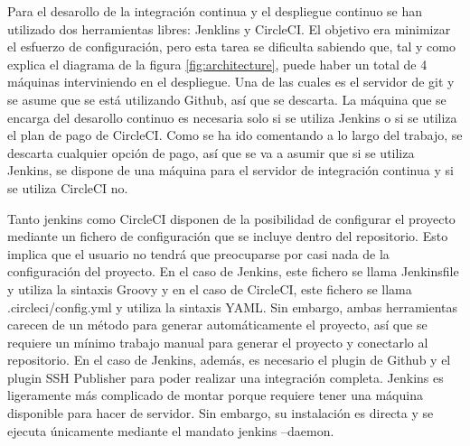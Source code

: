 Para el desarollo de la integración continua y el despliegue continuo se han utilizado dos herramientas libres: Jenklins y CircleCI. El objetivo era minimizar el esfuerzo de configuración, pero esta tarea se dificulta sabiendo que, tal y como explica el diagrama de la figura \cref{fig:architecture}, puede haber un total de 4 máquinas interviniendo en el despliegue. Una de las cuales es el servidor de git y se asume que se está utilizando Github, así que se descarta. La máquina que se encarga del desarollo continuo es necesaria solo si se utiliza Jenkins o si se utiliza el plan de pago de CircleCI. Como se ha ido comentando a lo largo del trabajo, se descarta cualquier opción de pago, así que se va a asumir que si se utiliza Jenkins, se dispone de una máquina para el servidor de integración continua y si se utiliza CircleCI no.

Tanto jenkins como CircleCI disponen de la posibilidad de configurar el proyecto mediante un fichero de configuración que se incluye dentro del repositorio. Esto implica que el usuario no tendrá que preocuparse por casi nada de la configuración del proyecto. En el caso de Jenkins, este fichero se llama Jenkinsfile y utiliza la sintaxis Groovy y en el caso de CircleCI, este fichero se llama .circleci/config.yml y utiliza la sintaxis YAML. Sin embargo, ambas herramientas carecen de un método para generar automáticamente el proyecto, así que se requiere un mínimo trabajo manual para generar el proyecto y conectarlo al repositorio. En el caso de Jenkins, además, es necesario el plugin de Github y el plugin SSH Publisher para poder realizar una integración completa. Jenkins es ligeramente más complicado de montar porque requiere tener una máquina disponible para hacer de servidor. Sin embargo, su instalación es directa y se ejecuta únicamente mediante el mandato jenkins --daemon.

